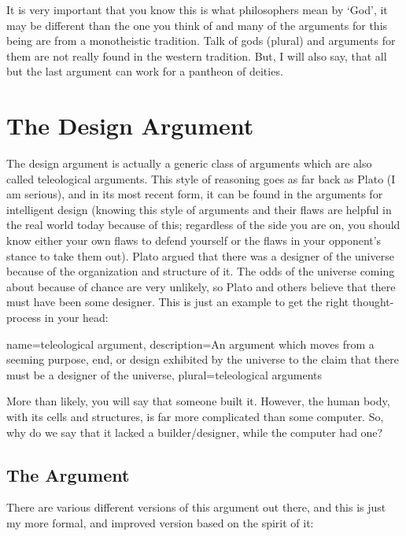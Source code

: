 It is very important that you know this is what philosophers mean by `God', it may be different than the one you think of and many of the arguments for this being are from a monotheistic tradition. Talk of gods (plural) and arguments for them are not really found in the western tradition. But, I will also say, that all but the last argument can work for a pantheon of deities. 

\section{The Design Argument}

The design argument is actually a generic class of arguments which are also called \glspl{teleological argument}. This style of reasoning goes as far back as Plato (I am serious), and in its most recent form, it can be found in the arguments for intelligent design (knowing this style of arguments and their flaws are helpful in the real world today because of this; regardless of the side you are on, you should know either your own flaws to defend yourself or the flaws in your opponent's stance to take them out). Plato argued that there was a designer of the universe because of the organization and structure of it. The odds of the universe coming about because of chance are very unlikely, so Plato and others believe that there must have been some designer. This is just an example to get the right thought-process in your head:

{
name=teleological argument,
description={An argument which moves from a seeming purpose, end, or design exhibited by the universe to the claim that there must be a designer of the universe},
plural=teleological arguments
}



More than likely, you will say that someone built it. However, the human body, with its cells and structures, is far more complicated than some computer. So, why do we say that it lacked a builder/designer, while the computer had one? 
\subsection{The Argument}
There are various different versions of this argument out there, and this is just my more formal, and improved version based on the spirit of it:

